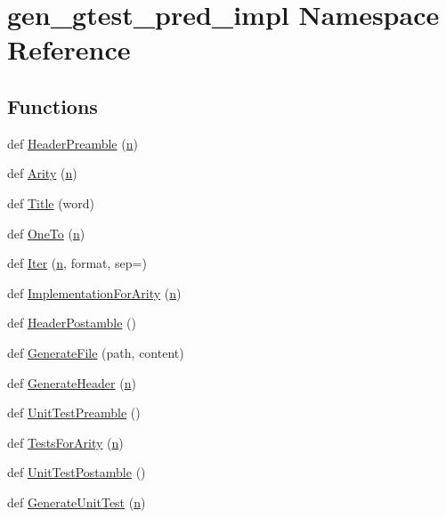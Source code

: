 \hypertarget{namespacegen__gtest__pred__impl}{}\section{gen\+\_\+gtest\+\_\+pred\+\_\+impl Namespace Reference}
\label{namespacegen__gtest__pred__impl}
\subsection*{Functions}
\begin{DoxyCompactItemize}
\item 
def \hyperlink{namespacegen__gtest__pred__impl_a0b99cadcffab4bf161654a382163bac8}{Header\+Preamble} (\hyperlink{app_2main_8cpp_acfc02ec89670db29251fda6a66602ce2}{n})
\item 
def \hyperlink{namespacegen__gtest__pred__impl_a5bbb7272f3588b969ab3ded6f49836a1}{Arity} (\hyperlink{app_2main_8cpp_acfc02ec89670db29251fda6a66602ce2}{n})
\item 
def \hyperlink{namespacegen__gtest__pred__impl_ae49dd9bd9152dbcb3ca7994ce04c37ba}{Title} (word)
\item 
def \hyperlink{namespacegen__gtest__pred__impl_a7920598d51c9dded76a4ef9ffde339e4}{One\+To} (\hyperlink{app_2main_8cpp_acfc02ec89670db29251fda6a66602ce2}{n})
\item 
def \hyperlink{namespacegen__gtest__pred__impl_ac016218b7c9437d1d5ac85c574c83069}{Iter} (\hyperlink{app_2main_8cpp_acfc02ec89670db29251fda6a66602ce2}{n}, format, sep=\textquotesingle{}\textquotesingle{})
\item 
def \hyperlink{namespacegen__gtest__pred__impl_a8c53b141b89f9c05d0131d9756dfeab0}{Implementation\+For\+Arity} (\hyperlink{app_2main_8cpp_acfc02ec89670db29251fda6a66602ce2}{n})
\item 
def \hyperlink{namespacegen__gtest__pred__impl_a3d40c7ef70cf4d46e56c9612f34027bf}{Header\+Postamble} ()
\item 
def \hyperlink{namespacegen__gtest__pred__impl_a16210fe365dfd176e04aa2578ac5a8d9}{Generate\+File} (path, content)
\item 
def \hyperlink{namespacegen__gtest__pred__impl_a6f3039a82a5283846fb272f8a3af6743}{Generate\+Header} (\hyperlink{app_2main_8cpp_acfc02ec89670db29251fda6a66602ce2}{n})
\item 
def \hyperlink{namespacegen__gtest__pred__impl_ae52dc86461d1b666c7b658a8c27c69f9}{Unit\+Test\+Preamble} ()
\item 
def \hyperlink{namespacegen__gtest__pred__impl_ab0da913fa15e5695d5bb2dd1de5dec57}{Tests\+For\+Arity} (\hyperlink{app_2main_8cpp_acfc02ec89670db29251fda6a66602ce2}{n})
\item 
def \hyperlink{namespacegen__gtest__pred__impl_a57b922f50d0807896496dcd883c1f098}{Unit\+Test\+Postamble} ()
\item 
def \hyperlink{namespacegen__gtest__pred__impl_acbd42b5b7fb7ddbb06a4dd58fc37e9ed}{Generate\+Unit\+Test} (\hyperlink{app_2main_8cpp_acfc02ec89670db29251fda6a66602ce2}{n})
\end{DoxyCompactItemize}
